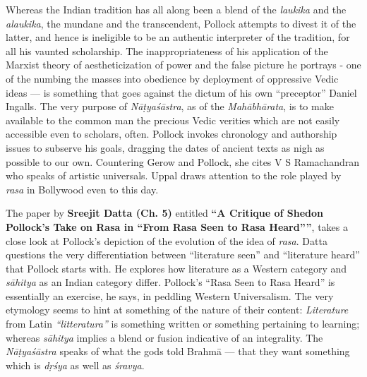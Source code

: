 Whereas the Indian tradition has all along been a blend of the \textsl{laukika} and the \textsl{alaukika}, the mundane and the transcendent, Pollock attempts to divest it of the latter, and hence is ineligible to be an authentic interpreter of the tradition, for all his vaunted scholarship. The inappropriateness of his application of the Marxist theory of aestheticization of power and the false picture he portrays - one of the numbing the masses into obedience by deployment of oppressive Vedic ideas --- is something that goes against the dictum of his own “preceptor” Daniel Ingalls. The very purpose of \textsl{Nāṭyaśāstra}, as of the \textsl{Mahābhārata}, is to make available to the common man the precious Vedic verities which are not easily accessible even to scholars, often. Pollock invokes chronology and authorship issues to subserve his goals, dragging the dates of ancient texts as nigh as possible to our own. Countering Gerow and Pollock, she cites V S Ramachandran who speaks of artistic universals. Uppal draws attention to the role played by \textsl{rasa} in Bollywood even to this day.

The paper by {\bf Sreejit Datta (Ch. 5)} entitled {\bf “A Critique of Shedon Pollock’s Take on Rasa in “From Rasa Seen to Rasa Heard””}, takes a close look at Pollock’s depiction of the evolution of the idea of \textsl{rasa}. Datta questions the very differentiation between “literature seen” and “literature heard” that Pollock starts with. He explores how literature as a Western category and \textsl{sāhitya} as an Indian category differ. Pollock’s “Rasa Seen to Rasa Heard” is essentially an exercise, he says, in peddling Western Universalism. The very etymology seems to hint at something of the nature of their content: \textsl{Literature} from Latin \textsl{“litteratura”} is something written or something pertaining to learning; whereas \textsl{sāhitya} implies a blend or fusion indicative of an integrality. The \textsl{Nāṭyaśāstra} speaks of what the gods told Brahmā --- that they want something which is \textsl{dṛśya} as well as \textsl{śravya}.

